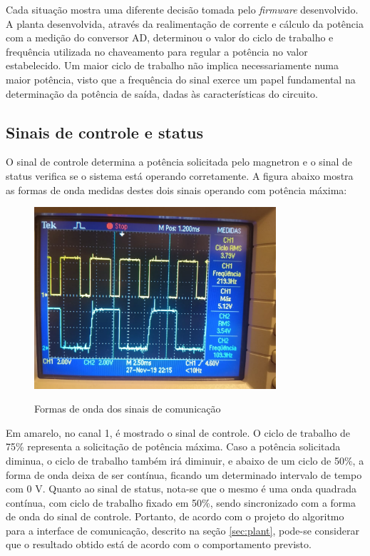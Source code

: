 Cada situação mostra uma diferente decisão tomada pelo \textit{firmware} desenvolvido. A planta desenvolvida, através da realimentação de corrente e cálculo da potência com a medição do conversor AD, determinou o valor do ciclo de trabalho e frequência utilizada no chaveamento para regular a potência no valor estabelecido. Um maior ciclo de trabalho não implica necessariamente numa maior potência, visto que a frequência do sinal exerce um papel fundamental na determinação da potência de saída, dadas às características do circuito.

\subsection{Sinais de controle e status}
O sinal de controle determina a potência solicitada pelo magnetron e o sinal de status verifica se o sistema está operando corretamente. A figura abaixo mostra as formas de onda medidas destes dois sinais operando com potência máxima:

\begin{figure}[H]
    \centering
    \caption{Formas de onda dos sinais de comunicação}
    \includegraphics[width=0.8\textwidth]{./dados/figuras/onda_comm}
    \label{fig:figura-onda_comm}
\end{figure}

Em amarelo, no canal 1, é mostrado o sinal de controle. O ciclo de trabalho de 75\% representa a solicitação de potência máxima. Caso a potência solicitada diminua, o ciclo de trabalho também irá diminuir, e abaixo de um ciclo de 50\%, a forma de onda deixa de ser contínua, ficando um determinado intervalo de tempo com 0 V. Quanto ao sinal de status, nota-se que o mesmo é uma onda quadrada contínua, com ciclo de trabalho fixado em 50\%, sendo sincronizado com a forma de onda do sinal de controle. Portanto, de acordo com o projeto do algoritmo para a interface de comunicação, descrito na seção \ref{sec:plant}, pode-se considerar que o resultado obtido está de acordo com o comportamento previsto.


